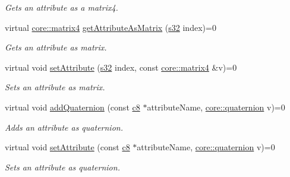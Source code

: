 \begin{DoxyCompactItemize}
\begin{DoxyCompactList}\small\item\em Gets an attribute as a matrix4. \end{DoxyCompactList}\item 
virtual \hyperlink{namespaceirr_1_1core_a73fa92e638c5ca97efd72da307cc9b65}{core\+::matrix4} \hyperlink{classirr_1_1io_1_1IAttributes_aaceb2fc0fca684d941918ce18d876336}{get\+Attribute\+As\+Matrix} (\hyperlink{namespaceirr_ac66849b7a6ed16e30ebede579f9b47c6}{s32} index)=0
\begin{DoxyCompactList}\small\item\em Gets an attribute as matrix. \end{DoxyCompactList}\item 
\mbox{\label{classirr_1_1io_1_1IAttributes_ae25f3ab5a4e8a8f27f4678c07b16e021}} 
virtual void \hyperlink{classirr_1_1io_1_1IAttributes_ae25f3ab5a4e8a8f27f4678c07b16e021}{set\+Attribute} (\hyperlink{namespaceirr_ac66849b7a6ed16e30ebede579f9b47c6}{s32} index, const \hyperlink{namespaceirr_1_1core_a73fa92e638c5ca97efd72da307cc9b65}{core\+::matrix4} \&v)=0
\begin{DoxyCompactList}\small\item\em Sets an attribute as matrix. \end{DoxyCompactList}\item 
\mbox{\label{classirr_1_1io_1_1IAttributes_af502127e96f12c3d4dc506455e586acc}} 
virtual void \hyperlink{classirr_1_1io_1_1IAttributes_af502127e96f12c3d4dc506455e586acc}{add\+Quaternion} (const \hyperlink{namespaceirr_a9395eaea339bcb546b319e9c96bf7410}{c8} $\ast$attribute\+Name, \hyperlink{classirr_1_1core_1_1quaternion}{core\+::quaternion} v)=0
\begin{DoxyCompactList}\small\item\em Adds an attribute as quaternion. \end{DoxyCompactList}\item 
\mbox{\label{classirr_1_1io_1_1IAttributes_a12488b48428edb2b0979f42a5cc6377a}} 
virtual void \hyperlink{classirr_1_1io_1_1IAttributes_a12488b48428edb2b0979f42a5cc6377a}{set\+Attribute} (const \hyperlink{namespaceirr_a9395eaea339bcb546b319e9c96bf7410}{c8} $\ast$attribute\+Name, \hyperlink{classirr_1_1core_1_1quaternion}{core\+::quaternion} v)=0
\begin{DoxyCompactList}\small\item\em Sets an attribute as quaternion. \end{DoxyCompactList}\item 

\end{DoxyCompactItemize}
